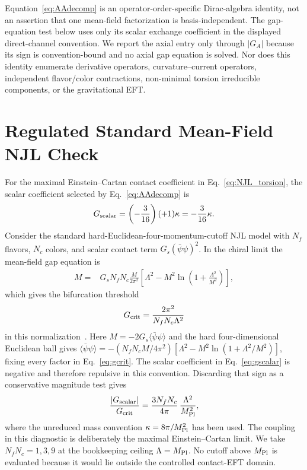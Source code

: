 \documentclass[aps,prd,twocolumn,superscriptaddress,showpacs,preprintnumbers,nofootinbib,longbibliography,floatfix]{revtex4-2}
\begin{document}
Equation~\eqref{eq:AAdecomp} is an operator-order-specific Dirac-algebra
identity, not an assertion that one mean-field factorization is
basis-independent.  The gap-equation test below uses only its scalar exchange
coefficient in the displayed direct-channel convention.  We report the axial
entry only through $|G_A|$ because its sign is convention-bound and no axial
gap equation is solved.  Nor does this identity enumerate derivative
operators, curvature--current operators, independent flavor/color
contractions, non-minimal torsion irreducible components, or the gravitational
EFT.

\section{Regulated Standard Mean-Field NJL Check}\label{app:njl_gap}

For the maximal Einstein--Cartan contact coefficient in
Eq.~\eqref{eq:NJL_torsion}, the scalar coefficient selected by
Eq.~\eqref{eq:AAdecomp} is
\begin{equation}\label{eq:gscalar}
G_{\rm scalar}=\left(-\frac{3}{16}\right)(+1)\kappa
=-\frac{3}{16}\kappa.
\end{equation}
Consider the standard hard-Euclidean-four-momentum-cutoff NJL model with
$N_f$ flavors, $N_c$ colors, and scalar contact term
$G_s(\bar\psi\psi)^2$.  In the chiral limit the mean-field gap equation is
\begin{align}
M={}&G_sN_fN_c\frac{M}{2\pi^2}
\left[\Lambda^2-M^2\ln\!\left(1+\frac{\Lambda^2}{M^2}\right)\right],
\end{align}
which gives the bifurcation threshold
\begin{equation}\label{eq:gcrit}
G_{\rm crit}=\frac{2\pi^2}{N_fN_c\Lambda^2}
\end{equation}
in this normalization~\cite{Klevansky1992,HatsudaKunihiro1994,Buballa2005}.
Here $M=-2G_s\langle\bar\psi\psi\rangle$ and the hard four-dimensional
Euclidean ball gives
$\langle\bar\psi\psi\rangle=-(N_fN_cM/4\pi^2)
[\Lambda^2-M^2\ln(1+\Lambda^2/M^2)]$, fixing every factor in
Eq.~\eqref{eq:gcrit}.
The scalar coefficient in Eq.~\eqref{eq:gscalar} is negative and therefore
repulsive in this convention.  Discarding that sign as a conservative
magnitude test gives
\begin{equation}\label{eq:ratio}
\frac{|G_{\rm scalar}|}{G_{\rm crit}}
=\frac{3N_fN_c}{4\pi}\,\frac{\Lambda^2}{M_{\rm Pl}^2},
\end{equation}
where the unreduced mass convention $\kappa=8\pi/M_{\rm Pl}^2$ has been used.
The coupling in this diagnostic is deliberately the maximal
Einstein--Cartan limit.  We take $N_fN_c=1,3,9$ at the bookkeeping ceiling
$\Lambda=M_{\rm Pl}$.  No cutoff above $M_{\rm Pl}$ is evaluated because it
would lie outside the controlled contact-EFT domain.
\end{document}

